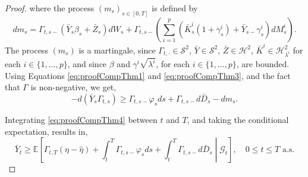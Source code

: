 \documentclass[11pt,a4paper]{article}
\numberwithin{equation}{section}
\theoremstyle{newPlain}
\theoremstyle{newDefinition}
\theoremstyle{newRemark}
\begin{document}
{\begin{proof}
where the process $(m_s)_{s\in[0,T]}$ is defined by 
\begin{equation}\label{eq:proofCompThm_m}
	dm_s = \Gamma_{t,s-}(\bar{Y}_s\beta_s+\bar{Z}_s)dW_s + \Gamma_{t,s-}(\sum_{i=1}^p(\bar{K}_s^i(1+\gamma_s^i)+\bar{Y}_{s-}\gamma_s^i)dM_s^i).
\end{equation}
The process $(m_s)$ is a martingale, since $\Gamma_{t,\cdot}\in\mathcal{S}^2$, $\bar{Y}\in\mathcal{S}^2$, $\bar{Z}\in\mathcal{H}^2$, $\bar{K}^i\in\mathcal{H}_{\lambda^i}^2$ for each $i\in\{1,\ldots,p\}$, and since $\beta$ and $\gamma^i\sqrt{\lambda^i}$, for each $i\in\{1,\ldots,p\}$, are bounded.
 Using Equations \eqref{eq:proofCompThm1} and \eqref{eq:proofCompThm3}, and the fact that $\Gamma$ is non-negative, we get,
\begin{equation}\label{eq:proofCompThm4}
    -d(\bar{Y}_s\Gamma_{t,s}) \ge \Gamma_{t,s-}\varphi_sds + \Gamma_{t,s-}d\bar{D}_s - dm_s.
\end{equation}

Integrating \eqref{eq:proofCompThm4} between $t$ and $T$, and taking the conditional expectation, results in,
\begin{equation}\label{eq:proofCompThm5}
    \bar{Y}_t \ge \mathbb{E}\left[\Gamma_{t,T}(\eta-\hat{\eta}) + \int_t^T\Gamma_{t,s-}\varphi_sds + \int_t^T\Gamma_{t,s-}d\bar{D}_s\middle|\mathcal{G}_t\right],\quad0\le t\le T\text{ a.s.}
\end{equation}


\end{proof}}
\end{document}
